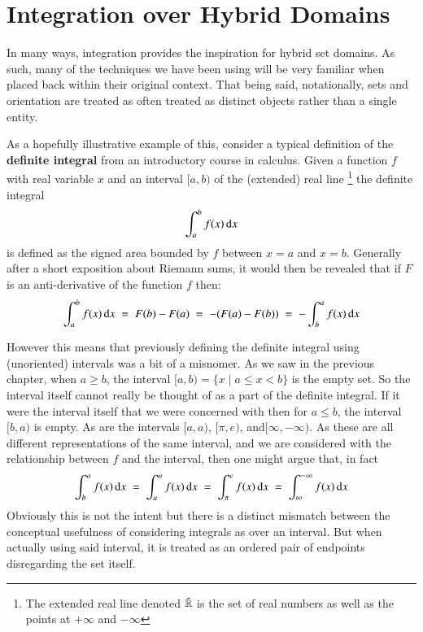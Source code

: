 \chapter{Integration over Hybrid Domains}
\label{chp:Integration}


%
%

In many ways, integration provides the inspiration for hybrid set domains.
As such, many of the techniques we have been using will be very familiar when placed back within their original context.
That being said, notationally, sets and orientation are treated as often treated as distinct objects rather than a single entity.


As a hopefully illustrative example of this, consider a typical definition of the \textbf{definite integral} from an introductory
course in calculus.
Given a function $f$ with real variable $x$ and an interval $[a,b)$ of the (extended) real line
\footnote{ The extended real line denoted $\bar{\mathbb{R}}$ is the set of real numbers as well as the points at 
$+\infty$ and $-\infty$} the definite integral
\begin{equation*}
	\int_a^b f(x) \mathop{}\!\mathrm{d} x
\end{equation*}
is defined as the signed area bounded by $f$ between $x=a$ and $x=b$.
Generally after a short exposition about Riemann sums, it would then be revealed that if $F$ is an anti-derivative of the
 function $f$ then:
\begin{equation*}
	\int_a^b f(x) \mathop{}\!\mathrm{d} x \;=\; F(b)-F(a) \;=\; - (F(a)-F(b)) \;=\; - \int_b^a f(x) \mathop{}\!\mathrm{d} x
\end{equation*}




However this means that previously defining the definite integral using (unoriented) intervals was a bit of a misnomer.
As we saw in the previous chapter, when $a \geq b$, the interval $[a,b) = \{ x \;|\; a \leq x < b \}$ is the empty set.
So the interval itself cannot really be thought of as a part of the definite integral.
If it were the interval itself that we were concerned with then for $a \leq b$, the interval $[b,a)$ is empty.
As are the intervals $[a,a)$, $[\pi, e)$, and$[\infty, -\infty)$.
As these are all different representations of the same interval, and we are considered with the relationship between $f$ and
the interval, then one might argue that, in fact
\begin{equation*}
	\int_b^a f(x) \mathop{}\!\mathrm{d} x \;=\; \int_a^a f(x) \mathop{}\!\mathrm{d} x \;=\; \int_\pi^e f(x)\mathop{}\!\mathrm{d} x \;=\; \int_\infty^{-\infty} f(x) \mathop{}\!\mathrm{d} x
\end{equation*}
Obviously this is not the intent but there is a distinct mismatch between the conceptual usefulness of considering
integrals as over an interval.
But when actually using said interval, it is treated as an ordered pair of endpoints disregarding the set itself.



